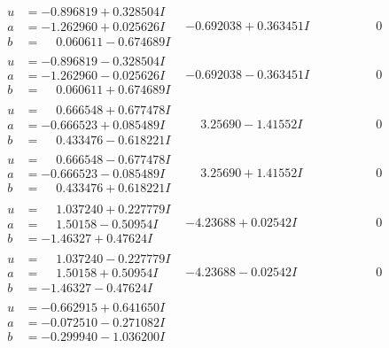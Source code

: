 \documentclass[1p]{elsarticle_modified}
\theoremstyle{definition}
\begin{document}
$$\begin{array}{c|c|c}
\begin{aligned}
u &= -0.896819 + 0.328504 I \\
a &= -1.262960 + 0.025626 I \\
b &= \phantom{-}0.060611 - 0.674689 I\end{aligned}
 & -0.692038 + 0.363451 I & \phantom{-0.000000 } 0 \\ \hline\begin{aligned}
u &= -0.896819 - 0.328504 I \\
a &= -1.262960 - 0.025626 I \\
b &= \phantom{-}0.060611 + 0.674689 I\end{aligned}
 & -0.692038 - 0.363451 I & \phantom{-0.000000 } 0 \\ \hline\begin{aligned}
u &= \phantom{-}0.666548 + 0.677478 I \\
a &= -0.666523 + 0.085489 I \\
b &= \phantom{-}0.433476 - 0.618221 I\end{aligned}
 & \phantom{-}3.25690 - 1.41552 I & \phantom{-0.000000 } 0 \\ \hline\begin{aligned}
u &= \phantom{-}0.666548 - 0.677478 I \\
a &= -0.666523 - 0.085489 I \\
b &= \phantom{-}0.433476 + 0.618221 I\end{aligned}
 & \phantom{-}3.25690 + 1.41552 I & \phantom{-0.000000 } 0 \\ \hline\begin{aligned}
u &= \phantom{-}1.037240 + 0.227779 I \\
a &= \phantom{-}1.50158 - 0.50954 I \\
b &= -1.46327 + 0.47624 I\end{aligned}
 & -4.23688 + 0.02542 I & \phantom{-0.000000 } 0 \\ \hline\begin{aligned}
u &= \phantom{-}1.037240 - 0.227779 I \\
a &= \phantom{-}1.50158 + 0.50954 I \\
b &= -1.46327 - 0.47624 I\end{aligned}
 & -4.23688 - 0.02542 I & \phantom{-0.000000 } 0 \\ \hline\begin{aligned}
u &= -0.662915 + 0.641650 I \\
a &= -0.072510 - 0.271082 I \\
b &= -0.299940 - 1.036200 I\end{aligned}

\end{array}$$
\end{document}
